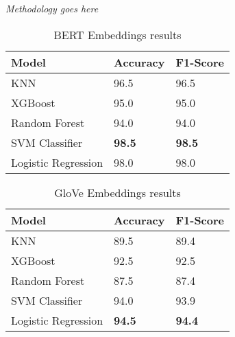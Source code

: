 \textit{Methodology goes here}

\begin{table}[hbt!]
\begin{threeparttable}
\caption{BERT Embeddings results}
\label{bert_embeddings_results}
\begin{tabular}{lll}
\toprule
\headrow Model & Accuracy & F1-Score\\
\midrule
KNN & 96.5 & 96.5\\ 
XGBoost & 95.0 & 95.0\\ 
Random Forest & 94.0 & 94.0\\ 
SVM Classifier & \textbf{98.5} & \textbf{98.5}\\ 
Logistic Regression & 98.0 & 98.0\\ 
\bottomrule
\end{tabular}
\end{threeparttable}
\end{table}

\begin{table}[hbt!]
\begin{threeparttable}
\caption{GloVe Embeddings results}
\label{glove_embeddings_results}
\begin{tabular}{lll}
\toprule
\headrow Model & Accuracy & F1-Score\\
\midrule
KNN & 89.5 & 89.4 \\ 
XGBoost & 92.5 & 92.5 \\ 
Random Forest & 87.5 & 87.4 \\ 
SVM Classifier & 94.0 & 93.9 \\ 
Logistic Regression & \textbf{94.5} & \textbf{94.4} \\ 
\bottomrule
\end{tabular}
\end{threeparttable}
\end{table}

